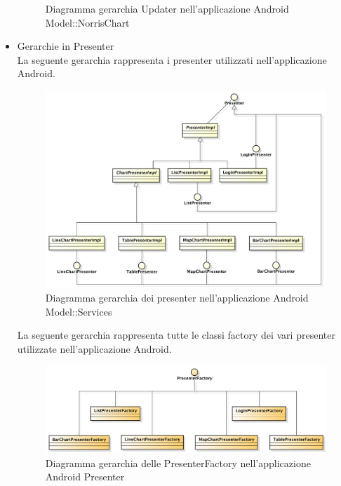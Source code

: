 \begin{itemize}
\begin{figure}[H]
                        \caption{Diagramma gerarchia Updater nell'applicazione Android Model::NorrisChart }
                    \end{figure}
                \item Gerarchie in Presenter \\
                    La seguente gerarchia rappresenta i presenter utilizzati nell'applicazione Android.
                    \begin{figure}[H]
                        \centering
                        \includegraphics{DefinizioneDiProdotto/Pics/Gerarchie/ApplicazionePresenter.pdf}
                        \caption{Diagramma gerarchia dei presenter nell'applicazione Android Model::Services}
                    \end{figure}
                    La seguente gerarchia rappresenta tutte le classi factory dei vari presenter utilizzate nell'applicazione Android.
                    \begin{figure}[H]
                        \centering
                        \includegraphics{DefinizioneDiProdotto/Pics/Gerarchie/ApplicazionePresenterFactory.pdf}
                        \caption{Diagramma gerarchia delle PresenterFactory nell'applicazione Android Presenter}

\end{figure}
\end{itemize}
